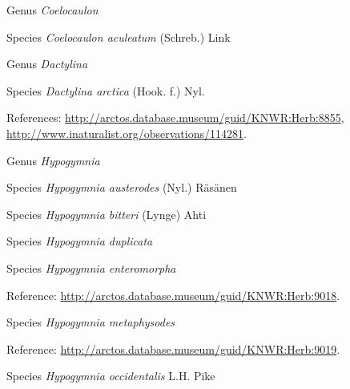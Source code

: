 \documentclass[9pt, article]{memoir}
\begin{document}
\begin{multicols}{2}
\vspace{6pt}\noindent\hspace{30pt}Genus \textit{Coelocaulon}


\vspace{6pt}\noindent\hspace{36pt}Species \textit{Coelocaulon aculeatum} (Schreb.) Link


\vspace{6pt}\noindent\hspace{30pt}Genus \textit{Dactylina}


\vspace{6pt}\noindent\hspace{36pt}Species \textit{Dactylina arctica} (Hook. f.) Nyl.


\vspace{6pt}References: 
\url{http://arctos.database.museum/guid/KNWR:Herb:8855}, 
\url{http://www.inaturalist.org/observations/114281}.

\vspace{6pt}\noindent\hspace{30pt}Genus \textit{Hypogymnia}


\vspace{6pt}\noindent\hspace{36pt}Species \textit{Hypogymnia austerodes} (Nyl.) Räsänen


\vspace{6pt}\noindent\hspace{36pt}Species \textit{Hypogymnia bitteri} (Lynge) Ahti


\vspace{6pt}\noindent\hspace{36pt}Species \textit{Hypogymnia duplicata}


\vspace{6pt}\noindent\hspace{36pt}Species \textit{Hypogymnia enteromorpha}


\vspace{6pt}Reference: 
\url{http://arctos.database.museum/guid/KNWR:Herb:9018}.

\vspace{6pt}\noindent\hspace{36pt}Species \textit{Hypogymnia metaphysodes}


\vspace{6pt}Reference: 
\url{http://arctos.database.museum/guid/KNWR:Herb:9019}.

\vspace{6pt}\noindent\hspace{36pt}Species \textit{Hypogymnia occidentalis} L.H. Pike



\end{multicols}
\end{document}

